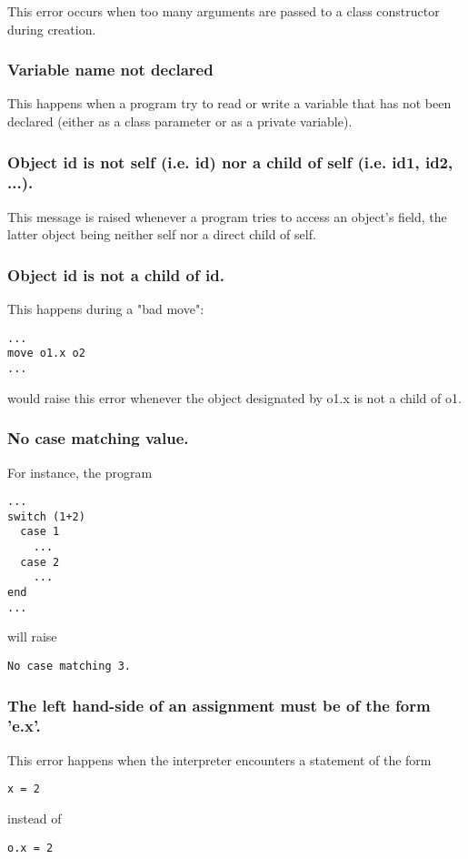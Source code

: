This error occurs when too many arguments are passed to a class constructor during creation.
\subsubsection{Variable name not declared}

This happens when a program try to read or write a variable that has not been declared (either as a class parameter or as a private variable).
\subsubsection{Object id is not self (i.e. id) nor a child of self (i.e. id1, id2, ...).}

This message is raised whenever a program tries to access an object's field, the latter object being neither self nor a direct child of self.
\subsubsection{Object id is not a child of id.}

This happens during a "bad move":
%
\begin{lstlisting}
...
move o1.x o2
...
\end{lstlisting}
%
would raise this error whenever the object designated by o1.x is not a child of o1.
\subsubsection{No case matching value.}

For instance, the program
%
\begin{lstlisting}
...
switch (1+2)
  case 1
    ...
  case 2
    ...
end
...
\end{lstlisting}
%
will raise
%
\begin{lstlisting}
No case matching 3.
\end{lstlisting}

\subsubsection{The left hand-side of an assignment must be of the form 'e.x'.}

This error happens when the interpreter encounters a statement of the form
%
\begin{lstlisting}
x = 2
\end{lstlisting}
%
instead of
%
\begin{lstlisting}
o.x = 2
\end{lstlisting}

